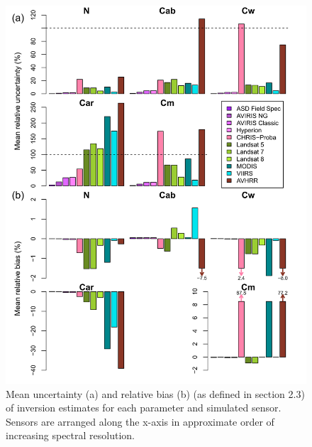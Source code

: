 \begin{figure}
  \centering
  \includegraphics[width=\textwidth]{2_rtm_inversion/figures/mean_error.pdf}
  \caption{%
    Mean uncertainty (a) and relative bias (b) (as defined in section 2.3) of inversion estimates for each parameter and simulated sensor.
    Sensors are arranged along the x-axis in approximate order of increasing spectral resolution.
  }\label{fig:pecanrtm-sensorerror}
\end{figure}


